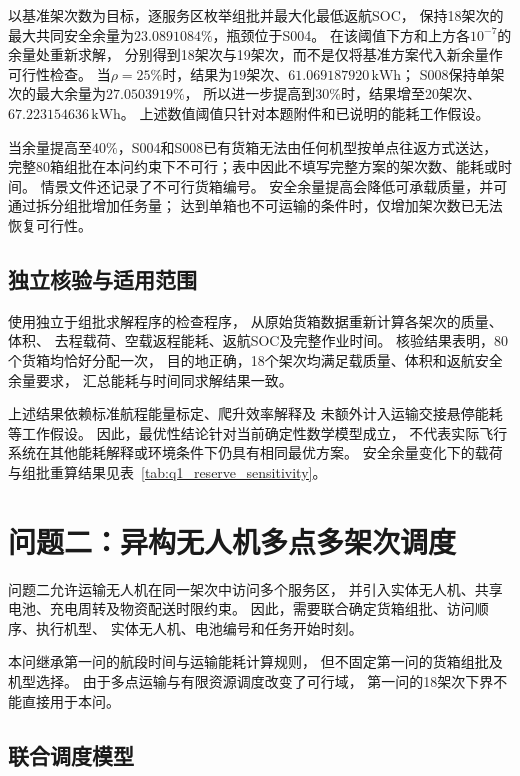 \documentclass[bwprint]{gmcmthesis}
\begin{document}
以基准架次数为目标，逐服务区枚举组批并最大化最低返航SOC，
保持18架次的最大共同安全余量为$23.0891084\%$，瓶颈位于S004。
在该阈值下方和上方各$10^{-7}$的余量处重新求解，
分别得到18架次与19架次，而不是仅将基准方案代入新余量作可行性检查。
当$\rho=25\%$时，结果为19架次、$61.069187920\,\mathrm{kWh}$；
S008保持单架次的最大余量为$27.0503919\%$，
所以进一步提高到$30\%$时，结果增至20架次、$67.223154636\,\mathrm{kWh}$。
上述数值阈值只针对本题附件和已说明的能耗工作假设。

当余量提高至$40\%$，S004和S008已有货箱无法由任何机型按单点往返方式送达，
完整80箱组批在本问约束下不可行；表中因此不填写完整方案的架次数、能耗或时间。
情景文件还记录了不可行货箱编号。
安全余量提高会降低可承载质量，并可通过拆分组批增加任务量；
达到单箱也不可运输的条件时，仅增加架次数已无法恢复可行性。

\subsection{独立核验与适用范围}

使用独立于组批求解程序的检查程序，
从原始货箱数据重新计算各架次的质量、体积、
去程载荷、空载返程能耗、返航SOC及完整作业时间。
核验结果表明，80个货箱均恰好分配一次，
目的地正确，18个架次均满足载质量、体积和返航安全余量要求，
汇总能耗与时间同求解结果一致。

上述结果依赖标准航程能量标定、爬升效率解释及
未额外计入运输交接悬停能耗等工作假设。
因此，最优性结论针对当前确定性数学模型成立，
不代表实际飞行系统在其他能耗解释或环境条件下仍具有相同最优方案。
安全余量变化下的载荷与组批重算结果见表~\ref{tab:q1_reserve_sensitivity}。


\section{问题二：异构无人机多点多架次调度}

问题二允许运输无人机在同一架次中访问多个服务区，
并引入实体无人机、共享电池、充电周转及物资配送时限约束。
因此，需要联合确定货箱组批、访问顺序、执行机型、
实体无人机、电池编号和任务开始时刻。

本问继承第一问的航段时间与运输能耗计算规则，
但不固定第一问的货箱组批及机型选择。
由于多点运输与有限资源调度改变了可行域，
第一问的18架次下界不能直接用于本问。

\subsection{联合调度模型}
\end{document}
